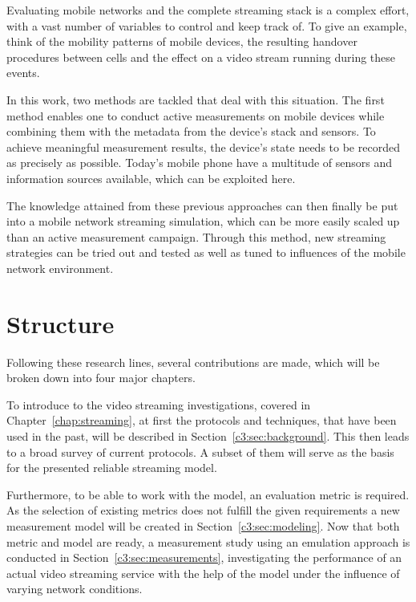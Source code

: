 Evaluating mobile networks and the complete streaming stack is a complex effort, with a vast number of variables to control and keep track of. To give an example, think of the mobility patterns of mobile devices, the resulting handover procedures between cells and the effect on a video stream running during these events. 

In this work, two methods are tackled that deal with this situation. The first method enables one to conduct active measurements on mobile devices while combining them with the metadata from the device's stack and sensors. To achieve meaningful measurement results, the device's state needs to be recorded as precisely as possible. Today's mobile phone have a multitude of sensors and information sources available, which can be exploited here.

The knowledge attained from these previous approaches can then finally be put into a mobile network streaming simulation, which can be more easily scaled up than an active measurement campaign. Through this method, new streaming strategies can be tried out and tested as well as tuned to influences of the mobile network environment.


\section{Structure}

Following these research lines, several contributions are made, which will be broken down into four major chapters.

To introduce to the video streaming investigations, covered in Chapter~\ref{chap:streaming}, at first the protocols and techniques, that have been used in the past, will be described in Section~\ref{c3:sec:background}. This then leads to a broad survey of current protocols. A subset of them will serve as the basis for the presented reliable streaming model. 

Furthermore, to be able to work with the model, an evaluation metric is required. As the selection of existing metrics does not fulfill the given requirements a new measurement model will be created in Section~\ref{c3:sec:modeling}. Now that both metric and model are ready, a measurement study using an emulation approach is conducted in Section~\ref{c3:sec:measurements}, investigating the performance of an actual video streaming service with the help of the model under the influence of varying network conditions.

